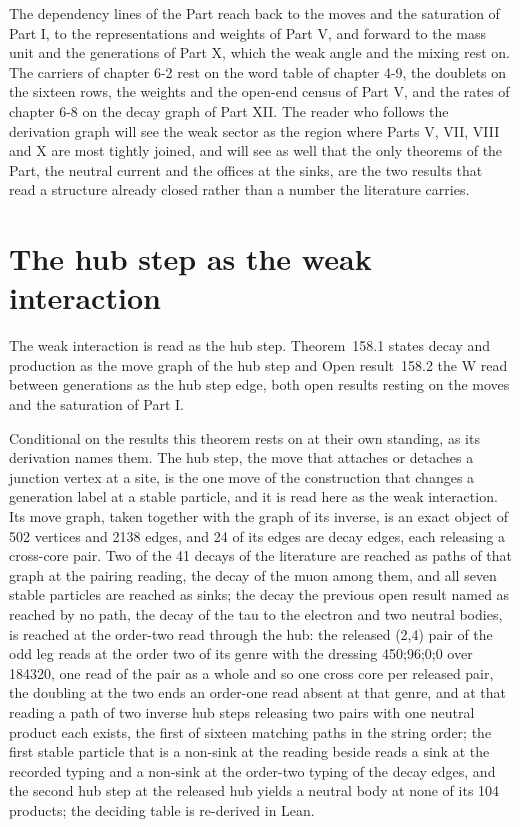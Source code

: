 The dependency lines of the Part reach back to the moves and the saturation of Part I, to the representations and weights of Part V, and forward to the mass unit and the generations of Part X, which the weak angle and the mixing rest on. The carriers of chapter 6-2 rest on the word table of chapter 4-9, the doublets on the sixteen rows, the weights and the open-end census of Part V, and the rates of chapter 6-8 on the decay graph of Part XII. The reader who follows the derivation graph will see the weak sector as the region where Parts V, VII, VIII and X are most tightly joined, and will see as well that the only theorems of the Part, the neutral current and the offices at the sinks, are the two results that read a structure already closed rather than a number the literature carries.
\section{The hub step as the weak interaction}\label{mod:VI-1-hub-step-as-the-weak-interaction}
\label{narr:open:6-1}The weak interaction is read as the hub step. Theorem~158.1 states decay and production as the move graph of the hub step and Open result~158.2 the W read between generations as the hub step edge, both open results resting on the moves and the saturation of Part I.
\begin{chconditional}\label{box:VI-1-hub-step-as-the-weak-interaction:1}
Conditional on the results this theorem rests on at their own standing, as its derivation names them.
The hub step, the move that attaches or detaches a junction vertex at a site, is the one move of the construction that changes a generation label at a stable particle, and it is read here as the weak interaction. Its move graph, taken together with the graph of its inverse, is an exact object of 502 vertices and 2138 edges, and 24 of its edges are decay edges, each releasing a cross-core pair. Two of the 41 decays of the literature are reached as paths of that graph at the pairing reading, the decay of the muon among them, and all seven stable particles are reached as sinks; the decay the previous open result named as reached by no path, the decay of the tau to the electron and two neutral bodies, is reached at the order-two read through the hub: the released (2,4) pair of the odd leg reads at the order two of its genre with the dressing 450;96;0;0 over 184320, one read of the pair as a whole and so one cross core per released pair, the doubling at the two ends an order-one read absent at that genre, and at that reading a path of two inverse hub steps releasing two pairs with one neutral product each exists, the first of sixteen matching paths in the string order; the first stable particle that is a non-sink at the reading beside reads a sink at the recorded typing and a non-sink at the order-two typing of the decay edges, and the second hub step at the released hub yields a neutral body at none of its 104 products; the deciding table is re-derived in Lean.
\end{chconditional}
